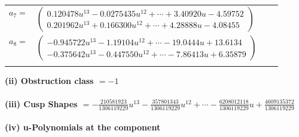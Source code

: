 \documentclass[1p]{elsarticle_modified}
\theoremstyle{definition}
\begin{document}
\begin{tabular}{m{7pt} m{180pt} m{7pt} m{180pt} }
\flushright $a_{7}=$&$\begin{pmatrix}0.120478 u^{13}-0.0275435 u^{12}+\cdots+3.40920 u-4.59752\\0.201962 u^{13}+0.166300 u^{12}+\cdots+4.28888 u-4.08455\end{pmatrix}$ \\
\flushright $a_{8}=$&$\begin{pmatrix}-0.945722 u^{13}-1.19104 u^{12}+\cdots-19.0444 u+13.6134\\-0.375642 u^{13}-0.447550 u^{12}+\cdots-7.86413 u+6.35879\end{pmatrix}$\\&\end{tabular}
\flushleft \textbf{(ii) Obstruction class $= -1$}\\~\\
\flushleft \textbf{(iii) Cusp Shapes $= -\frac{210581923}{1306119229} u^{13}-\frac{357801343}{1306119229} u^{12}+\cdots-\frac{6208012118}{1306119229} u+\frac{4609135372}{1306119229}$}\\~\\
\newpage\renewcommand{\arraystretch}{1}
\flushleft \textbf{(iv) u-Polynomials at the component}\newline \\
\end{document}
